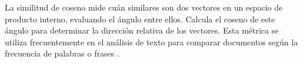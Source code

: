 La similitud de coseno mide cuán similares son dos vectores en un espacio de producto interno, evaluando el ángulo entre ellos. Calcula el coseno de este ángulo para determinar la dirección relativa de los vectores. Esta métrica se utiliza frecuentemente en el análisis de texto para comparar documentos según la frecuencia de palabras o frases \cite{COSINE-SIMILARITY}.